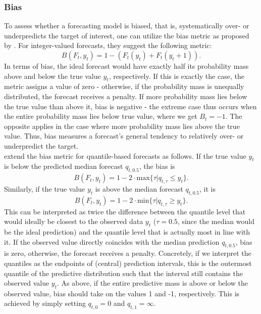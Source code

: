 \subsubsection{Bias}
To assess whether a forecasting model is biased, that is, systematically over- or underpredicts the target of interest, one can utilize the bias metric as proposed by \cite{funk_assessing_nodate}. For integer-valued forecasts, they suggest the following metric:
\begin{equation*}
B(F_t, y_t) = 1 - (F_t(y_t) + F_t(y_t + 1)).
\end{equation*}
In terms of bias, the ideal forecast would have exactly half its probability mass above and below the true value $y_t$, respectively. If this is exactly the case, the metric assigns a value of zero - otherwise, if the probability mass is unequally distributed, the forecast receives a penalty. If more probability mass lies below  the true value than above it, bias is negative - the extreme case thus occurs when the entire probability mass lies below true value, where we get $B_t = -1$. The opposite applies in the case where more probability mass lies above the true value. Thus, bias measures a forecast's general tendency to relatively over- or underpredict the target.\\
\cite{bosse_evaluating_2022} extend the bias metric for quantile-based forecasts as follows. If the true value $y_t$ is below the predicted median forecast $q_{t,0.5}$, the bias is 
\begin{equation*}
B(F_t, y_t) = 1 - 2 \cdot \text{max}\{\tau | q_{t,\tau} \leq y_t \}.
\end{equation*}
Similarly, if the true value $y_t$ is above the median forecast $q_{t,0.5}$, it is
\begin{equation*}
B(F_t, y_t) = 1 - 2 \cdot \text{min}\{\tau | q_{t,\tau} \geq y_t \}.
\end{equation*}
This can be interpreted as twice the difference between the quantile level that would ideally be closest to the observed data $y_t$ ($\tau = 0.5$, since the median would be the ideal prediction) and the quantile level that is actually most in line with it. If the observed value directly coincides with the median prediction $q_{t, 0.5}$, bias is zero, otherwise, the forecast receives a penalty. Concretely, if we interpret the quantiles as the endpoints of (central) prediction intervals, this is the outermost quantile of the predictive distribution such that the interval still contains the observed value $y_t$. As above, if the entire predictive mass is above or below the observed value, bias should take on the values 1 and -1, respectively. This is achieved by simply setting $q_{t,0} = 0$ and $q_{t,1} = \infty$.\\

